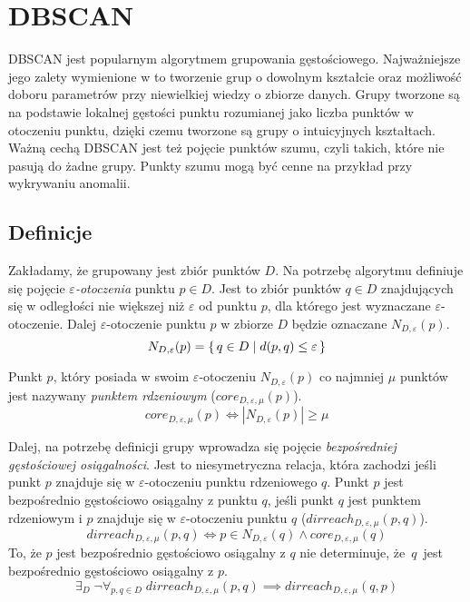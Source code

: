 \section{DBSCAN}
DBSCAN jest popularnym algorytmem grupowania gęstościowego. Najważniejsze jego zalety wymienione w \cite{dbscan} to tworzenie grup o dowolnym kształcie oraz możliwość doboru parametrów przy niewielkiej wiedzy o zbiorze danych. Grupy tworzone są na podstawie lokalnej gęstości punktu rozumianej jako liczba punktów w otoczeniu punktu, dzięki czemu tworzone są grupy o intuicyjnych kształtach. Ważną cechą DBSCAN jest też pojęcie punktów szumu, czyli takich, które nie pasują do żadne grupy. Punkty szumu mogą być cenne na przykład przy wykrywaniu anomalii.

\subsection{Definicje}
Zakładamy, że grupowany jest zbiór punktów $ D $. Na potrzebę algorytmu definiuje się pojęcie \textit{$ \varepsilon $-otoczenia} punktu $ p \in D $. Jest to zbiór punktów $ q \in D $ znajdujących się w odległości nie większej niż $ \varepsilon $ od punktu $ p $, dla którego jest wyznaczane $\varepsilon$-otoczenie. Dalej $\varepsilon$-otoczenie punktu $ p $ w zbiorze $ D $ będzie oznaczane $ N_{D,\varepsilon}(p) $.
\begin{equation}\label{eps-neighbourhood}
	N_{D,\varepsilon}(p) = \set{q \in D | d(p, q) \le \varepsilon}
\end{equation}

Punkt $ p $, który posiada w swoim $ \varepsilon $-otoczeniu $ N_{D,\varepsilon}(p) $ co najmniej $ \mu $ punktów jest nazywany \textit{punktem rdzeniowym} ($ core_{D,\varepsilon,\mu}(p) $).
\begin{equation}\label{core-point}
	core_{D,\varepsilon,\mu}(p) \iff |N_{D,\varepsilon}(p)| \ge \mu
\end{equation}



Dalej, na potrzebę definicji grupy wprowadza się pojęcie \textit{bezpośredniej gęstościowej osiągalności}. Jest to niesymetryczna relacja, która zachodzi jeśli punkt $ p $ znajduje się w $ \varepsilon $-otoczeniu punktu rdzeniowego $ q $. Punkt $ p $ jest bezpośrednio gęstościowo osiągalny z punktu $ q $, jeśli punkt $ q $ jest punktem rdzeniowym i $ p $ znajduje się w $ \varepsilon $-otoczeniu punktu $ q $ ($ dirreach_{D,\varepsilon,\mu}(p, q) $).
\begin{equation} \label{direct-reachability}
	dirreach_{D,\varepsilon,\mu}(p, q) \iff p \in N_{D,\varepsilon}(q) \land core_{D,\varepsilon,\mu}(q)
\end{equation}
To, że $ p $ jest bezpośrednio gęstościowo osiągalny z $ q $ nie determinuje, \mbox{że $ q $ jest} bezpośrednio gęstościowo osiągalny z $ p $.
\begin{equation} \label{direct-reachability-asymmetry}
	\exists_D\;\neg\forall_{p,q\in D}\;dirreach_{D,\varepsilon,\mu}(p, q) \implies dirreach_{D,\varepsilon,\mu}(q, p)
\end{equation}

